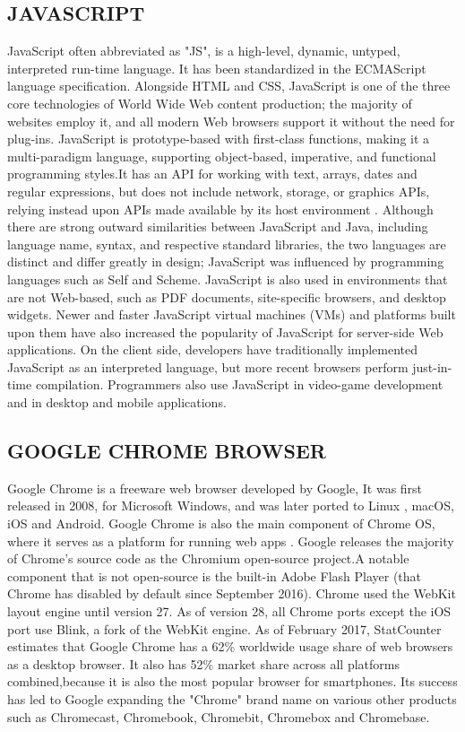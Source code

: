\documentclass[11pt]{report} %
\begin{document}
\subsection{JAVASCRIPT}
\label{subsec:JAVASCRIPT}
JavaScript \cite{JavascriptTutorialspoint,powell2004javascript}  often abbreviated as "JS", is a high-level, dynamic, untyped, interpreted run-time language. It has been standardized in the ECMAScript language specification. Alongside HTML\cite{htmlW3schools} and CSS\cite{cssW3schools}, JavaScript is one of the three core technologies of World Wide Web content production; the majority of websites employ it, and all modern Web browsers support it without the need for plug-ins\cite{Ahmed:2014:WDP:2675602}. JavaScript is prototype-based with first-class functions, making it a multi-paradigm language, supporting object-based, imperative, and functional programming styles.It has an API for working with text, arrays, dates and regular expressions, but does not include network, storage, or graphics APIs, relying instead upon APIs made available by its host environment\cite{js_validation_apiW3schools} .
Although there are strong outward similarities between JavaScript and Java, including language name, syntax, and respective standard libraries, the two languages are distinct and differ greatly in design; JavaScript was influenced by programming languages such as Self and Scheme.
JavaScript is also used in environments that are not Web-based, such as PDF documents, site-specific browsers, and desktop widgets. Newer and faster JavaScript virtual machines (VMs) and platforms built upon them have also increased the popularity of JavaScript for server-side Web applications. On the client side, developers have traditionally implemented JavaScript as an interpreted language, but more recent browsers perform just-in-time compilation. Programmers also use JavaScript in video-game development and in desktop and mobile applications.

\subsection{GOOGLE CHROME BROWSER}
\label{subsec:GOOGLE CHROME BROWSER}
Google Chrome is a freeware web browser developed by Google, It was first released in 2008, for Microsoft Windows, and was later ported to Linux\cite{Siever:2005:LN:1212560} , macOS, iOS and Android. Google Chrome is also the main component of Chrome OS, where it serves as a platform for running web apps \cite{chromeExtension}.
Google releases the majority of Chrome's source code as the Chromium open-source project.A notable component that is not open-source is the built-in Adobe Flash Player (that Chrome has disabled by default since September 2016). Chrome used the WebKit layout engine until version 27. As of version 28, all Chrome ports except the iOS port use Blink, a fork of the WebKit engine.
As of February 2017, StatCounter estimates that Google Chrome has a 62\% worldwide usage share of web browsers as a desktop browser. It also has 52\% market share across all platforms combined,because it is also the most popular browser for smartphones. Its success has led to Google expanding the "Chrome" brand name on various other products such as Chromecast, Chromebook, Chromebit, Chromebox and Chromebase.
\end{document}
